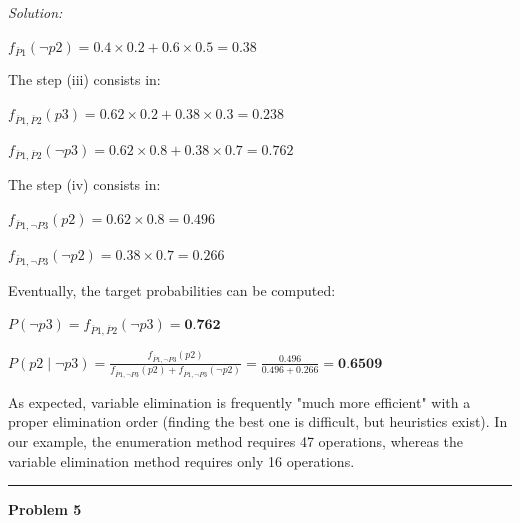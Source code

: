 \documentclass[a4paper, 11pt]{article}
\newenvironment{problem}[2][Problem]
    { \begin{mdframed}[backgroundcolor=gray!20] \textbf{#1 #2} \\}
    {  \end{mdframed}}
\newenvironment{solution}
    {\textit{Solution:}}
    {}
\begin{document}
{\begin{solution}
\begin{center}
		$f_{\overline P1}(\neg p2) = 0.4 \times 0.2 + 0.6 \times 0.5 = 0.38$
	\end{center}
	The step (iii) consists in:
	\begin{center}
		$f_{\overline P1, \overline P2}(p3) = 0.62 \times 0.2 + 0.38 \times 0.3 = 0.238$
		
		$f_{\overline P1, \overline P2}(\neg p3) = 0.62 \times 0.8 + 0.38 \times 0.7 = 0.762$
	\end{center}
	The step (iv) consists in:
	\begin{center}
		$f_{\overline P1, \neg P3}(p2) = 0.62 \times 0.8 = 0.496$
		
		$f_{\overline P1, \neg P3}(\neg p2) = 0.38 \times 0.7 = 0.266$
	\end{center}
	Eventually, the target probabilities can be computed:
	\begin{center}
		$P(\neg p3) = f_{\overline P1, \overline P2}(\neg p3) = \textbf{0.762}$
		
		$P(p2 \mid \neg p3) = \frac{f_{\overline P1, \neg P3}(p2)}{f_{\overline P1, \neg P3}(p2) + f_{\overline P1, \neg P3}(\neg p2)} = \frac{0.496}{0.496 + 0.266} = \textbf{0.6509}$
	\end{center}
	As expected, variable elimination is frequently "much more efficient" with a proper elimination order (finding the best one is difficult, but heuristics exist). In our example, the enumeration method requires 47 operations, whereas the variable elimination method requires only 16 operations.
\end{solution}
\\\noindent\rule{7in}{2.8pt}
\pagebreak
\begin{problem}{5}
	

\end{problem}}
\end{document}
